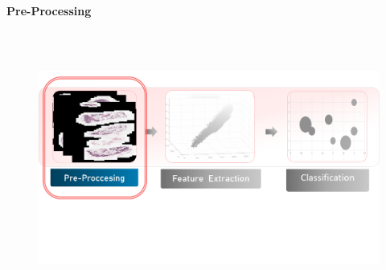 \documentclass[usenames,dvipsnames]{beamer}
\begin{document}
\begin{frame}{\textbf{Pre-Processing }}

\vspace{-0.5cm}
\begin{figure}
    \centering
  \includegraphics[height=9cm,width=14cm]{imagenes3/medotologia2.png}
   
\end{figure}

     
\end{frame}
\end{document}
